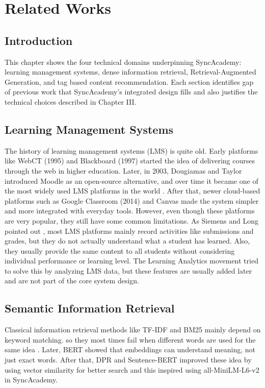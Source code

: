 \documentclass[12pt,a4paper]{report}
\begin{document}
\chapter{Related Works}

\section{Introduction}

This chapter shows the four technical domains underpinning SyncAcademy: learning
management systems, dense information retrieval, Retrieval-Augmented Generation, and
tag based content recommendation. Each section identifies gap of previous work that SyncAcademy’s integrated design fills and also justifies the technical choices described in Chapter III. 
\section{Learning Management Systems}

The history of learning management systems (LMS) is quite old. Early platforms like WebCT (1995) and Blackboard (1997) started the idea of delivering courses through the web in higher education. Later, in 2003, Dougiamas and Taylor introduced Moodle as an open-source alternative, and over time it became one of the most widely used LMS platforms in the world \cite{moodle}. After that, newer cloud-based platforms such as Google Classroom (2014) and Canvas made the system simpler and more integrated with everyday tools. However, even though these platforms are very popular, they still have some common limitations. As Siemens and Long pointed out \cite{siemens}, most LMS platforms mainly record activities like submissions and grades, but they do not actually understand what a student has learned. Also, they usually provide the same content to all students without considering individual performance or learning level. The Learning Analytics movement tried to solve this by analyzing LMS data, but these features are usually added later and are not part of the core system design.

\section{Semantic Information Retrieval}


Classical information retrieval methods like TF-IDF and BM25 mainly depend on keyword matching. so they most times fail when different words are used for the same idea \cite{bm25}. Later, BERT \cite{bert} showed that embeddings can understand meaning, not just exact words. After that, DPR \cite{dpr} and Sentence-BERT \cite{sbert} improved these idea by using vector similarity for better search and this inspired using all-MiniLM-L6-v2 in SyncAcademy.
\end{document}
